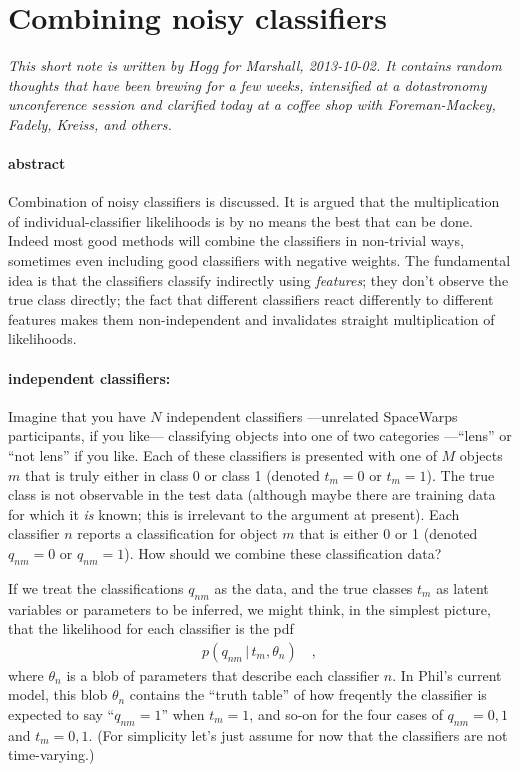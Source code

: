 \documentclass[12pt]{article}
\newcommand{\given}{\,|\,}
\begin{document}
\section*{Combining noisy classifiers}

\textsl{This short note is written by Hogg for Marshall, 2013-10-02.
  It contains random thoughts that have been brewing for a few weeks,
  intensified at a dotastronomy unconference session
  and clarified today at a coffee shop with Foreman-Mackey, Fadely, Kreiss, and others.}

\paragraph{abstract}
Combination of noisy classifiers is discussed.
It is argued that the multiplication of individual-classifier likelihoods is
  by no means the best that can be done.
Indeed most good methods will combine the classifiers in non-trivial ways,
  sometimes even including good classifiers with negative weights.
The fundamental idea is that the classifiers classify indirectly using \emph{features};
  they don't observe the true class directly;
  the fact that different classifiers react differently to different features
  makes them non-independent and invalidates straight multiplication of likelihoods.

\paragraph{independent classifiers:}
Imagine that you have $N$ independent classifiers%
  ---unrelated SpaceWarps participants, if you like---%
  classifying objects into one of two categories%
  ---``lens'' or ``not lens'' if you like.
Each of these classifiers is presented with one of $M$ objects $m$
  that is truly either in class 0 or class 1
  (denoted $t_m=0$ or $t_m=1$).
The true class is not observable in the test data
  (although maybe there are training data for which it \emph{is} known;
    this is irrelevant to the argument at present).
Each classifier $n$ reports a classification for object $m$ that is either 0 or 1
  (denoted $q_{nm}=0$ or $q_{nm}=1$).
How should we combine these classification data?

If we treat the classifications $q_{nm}$ as the data,
  and the true classes $t_m$ as latent variables or parameters to be inferred,
  we might think, in the simplest picture, that the likelihood for each classifier is the pdf
\begin{eqnarray}
p(q_{nm}\given t_m, \theta_n)
\quad ,
\end{eqnarray}
  where $\theta_n$ is a blob of parameters that describe each classifier $n$.
In Phil's current model, this blob $\theta_n$ contains the ``truth table''
  of how freqently the classifier is expected to say ``$q_{nm}=1$'' when $t_m=1$,
  and so-on for the four cases of $q_{nm}=0,1$ and $t_m=0,1$.
(For simplicity let's just assume for now that the classifiers are not time-varying.)
\end{document}
